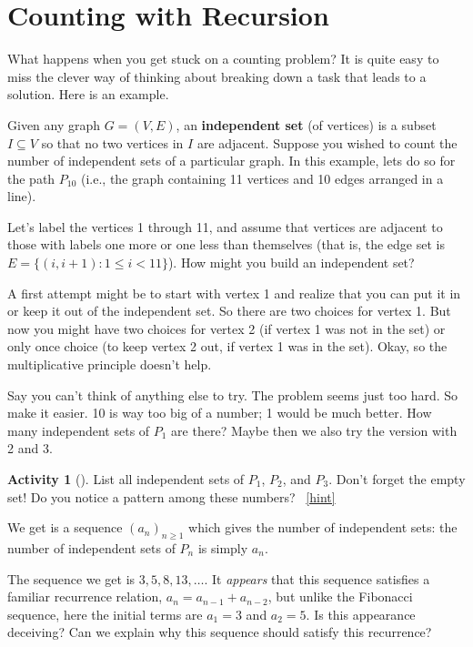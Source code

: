 \documentclass[10pt,]{book}
\newcommand{\terminology}[1]{\textbf{#1}}
\theoremstyle{plain}
\theoremstyle{definition}
\theoremstyle{definition}
\theoremstyle{definition}
\newtheorem{activity}[project]{Activity}
\numberwithin{equation}{chapter}
\def\st{:}
\newcommand{\lt}{<}
\begin{document}
\section[{Counting with Recursion}]{Counting with Recursion}\label{sec_basic-recursion}
\hypertarget{p-882}{}%
What happens when you get stuck on a counting problem?  It is quite easy to miss the clever way of thinking about breaking down a task that leads to a solution.  Here is an example.%
\par
\hypertarget{p-883}{}%
Given any graph \(G = (V, E)\), an \terminology{independent set} (of vertices) is a subset \(I \subseteq V\) so that no two vertices in \(I\) are adjacent.  Suppose you wished to count the number of independent sets of a particular graph.  In this example, lets do so for the path \(P_{10}\) (i.e., the graph containing 11 vertices and 10 edges arranged in a line).%
\par
\hypertarget{p-884}{}%
Let's label the vertices 1 through 11, and assume that vertices are adjacent to those with labels one more or one less than themselves (that is, the edge set is \(E = \{(i,i+1) \st 1 \le i \lt 11\}\)).  How might you build an independent set?%
\par
\hypertarget{p-885}{}%
A first attempt might be to start with vertex 1 and realize that you can put it in or keep it out of the independent set.  So there are two choices for vertex 1.  But now you might have two choices for vertex 2 (if vertex 1 was not in the set) or only once choice (to keep vertex 2 out, if vertex 1 was in the set).  Okay, so the multiplicative principle doesn't help.%
\par
\hypertarget{p-886}{}%
Say you can't think of anything else to try.  The problem seems just too hard.  So make it easier.  10 is way too big of a number; 1 would be much better.  How many independent sets of \(P_1\) are there?  Maybe then we also try the version with 2 and 3.%
\begin{activity}[]\label{activity-125}
\hypertarget{p-887}{}%
List all independent sets of \(P_1\), \(P_2\), and \(P_3\).  Don't forget the empty set! Do you notice a pattern among these numbers?%
~\hfill{\tiny\hyperlink{a-132}{[hint]}\hypertarget{q-132}{}}\end{activity}
\hypertarget{p-889}{}%
We get is a sequence \((a_n)_{n \ge 1}\) which gives the number of independent sets: the number of independent sets of \(P_n\) is simply \(a_n\).%
\par
\hypertarget{p-890}{}%
The sequence we get is \(3, 5, 8, 13, \ldots\).  It \emph{appears} that this sequence satisfies a familiar recurrence relation, \(a_n = a_{n-1} + a_{n-2}\), but unlike the Fibonacci sequence, here the initial terms are \(a_1 = 3\) and \(a_2 = 5\).  Is this appearance deceiving?  Can we explain why this sequence should satisfy this recurrence?%
\end{document}

